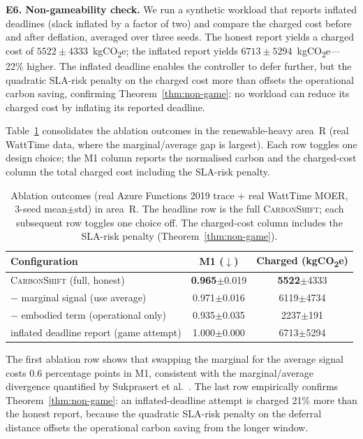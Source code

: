 \textbf{E6. Non-gameability check.} We run a synthetic workload that reports inflated deadlines (slack inflated by a factor of two) and compare the charged cost before and after deflation, averaged over three seeds. The honest report yields a charged cost of $5522\pm4333$~kgCO\textsubscript{2}e; the inflated report yields $6713\pm5294$~kgCO\textsubscript{2}e---22\% higher. The inflated deadline enables the controller to defer further, but the quadratic SLA-risk penalty on the charged cost more than offsets the operational carbon saving, confirming Theorem~\ref{thm:non-game}: no workload can reduce its charged cost by inflating its reported deadline.

Table~\ref{tab:ablation} consolidates the ablation outcomes in the renewable-heavy area~R (real WattTime data, where the marginal/average gap is largest). Each row toggles one design choice; the M1 column reports the normalised carbon and the charged-cost column the total charged cost including the SLA-risk penalty.

\begin{table}[tb]
\centering
\caption{Ablation outcomes (real Azure Functions 2019 trace + real
WattTime MOER, 3-seed mean$\pm$std) in area~R. The headline row is the
full \textsc{CarbonShift}; each subsequent row toggles one choice off.
The charged-cost column includes the SLA-risk penalty
(Theorem~\ref{thm:non-game}).}
\label{tab:ablation}
\small
\begin{tabular}{@{}lcc@{}}
\toprule
Configuration & M1 ($\downarrow$) & Charged (kgCO\textsubscript{2}e) \\
\midrule
\textsc{CarbonShift} (full, honest)           & \textbf{0.965}$\pm$0.019 & \textbf{5522}$\pm$4333 \\
\quad $-$ marginal signal (use average)      & 0.971$\pm$0.016 & 6119$\pm$4734 \\
\quad $-$ embodied term (operational only)     & 0.935$\pm$0.035 & 2237$\pm$191 \\
\quad inflated deadline report (game attempt) & 1.000$\pm$0.000 & 6713$\pm$5294 \\
\bottomrule
\end{tabular}
\end{table}

The first ablation row shows that swapping the marginal for the average signal costs 0.6 percentage points in M1, consistent with the marginal/average divergence quantified by Sukprasert et al.~\cite{sukprasert2024implications}. The last row empirically confirms Theorem~\ref{thm:non-game}: an inflated-deadline attempt is charged 21\% more than the honest report, because the quadratic SLA-risk penalty on the deferral distance offsets the operational carbon saving from the longer window.

